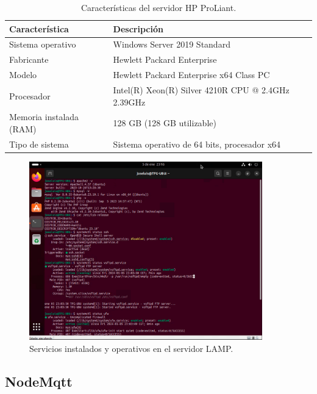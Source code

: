 \begin{table}[htbp]
\begin{center}
\caption{Características del servidor HP ProLiant.}
\begin{tabular}{|l|l|}
\hline
\rowcolor[HTML]{C0C0C0} 
\textbf{Característica} & \textbf{Descripción}\\ \hline
Sistema operativo & Windows Server 2019 Standard\\ \hline
Fabricante & Hewlett Packard Enterprise \\ \hline
Modelo & Hewlett Packard Enterprise x64 Class PC\\ \hline
Procesador & Intel(R) Xeon(R) Silver 4210R CPU @ 2.4GHz 2.39GHz\\ \hline
Memoria instalada (RAM) & 128 GB (128 GB utilizable) \\ \hline
Tipo de sistema & Sistema operativo de 64 bits, procesador x64 \\ \hline
\end{tabular}
\end{center}
\end{table}

\begin{figure}[h]
	\centering
	\includegraphics[width=0.9\textwidth]{img/desarrollo/LAMP_servicios.png}
	\caption{Servicios instalados y operativos en el servidor LAMP.} \label{Img:LAMP_servicios}
\end{figure}

\subsection{NodeMqtt}\label{proyecto:NodeMqtt}

